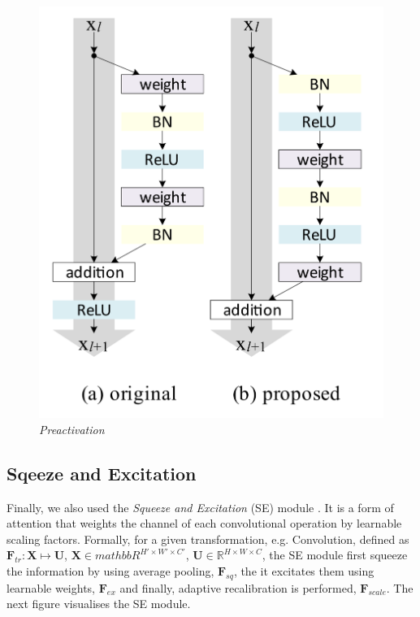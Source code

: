 \documentclass[../document.tex]{subfiles}
\begin{document}
\begin{figure}[htbp]
    \centering
    \includegraphics[scale=0.2]{../img/implementation/estimator/preactivation.png}
    \caption{\emph{Preactivation} \cite{he2015identity}}
\end{figure}
\subsection{Sqeeze and Excitation}
Finally, we also used the \emph{Squeeze and Excitation} (SE) module \cite{hu2017squeeze}. It is a form of attention that weights the channel of each convolutional operation by learnable scaling factors. Formally, for a given transformation, e.g. Convolution, defined as $\bm{F}_{tr}  : \bm{X} \mapsto \bm{U}$, $\bm{X} \in mathbb{R}^{H' \times W' \times C'}$, $\bm{U} \in \mathbb{R}^{H \times W \times C}$, the SE module first squeeze the information by using average pooling, $\bm{F}_{sq}$, the it excitates them using learnable weights, $\bm{F}_{ex}$ and finally, adaptive recalibration is performed, $\bm{F}_{scale}$.
The next figure visualises the SE module.
\end{document}
